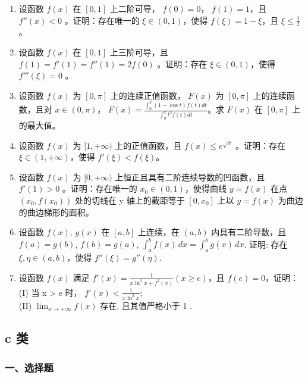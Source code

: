 \documentclass[12pt, a4paper]{ctexart}
\begin{document}
\begin{enumerate}[start=37]
    \item 设函数 $ f(x) $ 在 $ [0,1] $ 上二阶可导， $ f(0)=0 $， $ f(1)=1 $，且 $ f''(x)<0 $ 。证明：存在唯一的 $ \xi \in (0,1) $，使得 $ f(\xi)=1-\xi $，且 $ \xi \leq \frac{1}{2} $ 。

    \item 设函数 $ f(x) $ 在 $ [0,1] $ 上三阶可导，且 $ f(1) = f'(1) = f''(1) = 2f(0) $ 。证明：存在 $ \xi \in (0,1) $，使得 $ f'''(\xi) = 0 $ 。

    \item 设函数 $ f(x) $ 为 $ [0,\pi] $ 上的连续正值函数， $ F(x) $ 为 $ [0,\pi] $ 上的连续函数，且对 $ x \in (0,\pi) $， $ F(x) = \frac{\int_{0}^{x}(1 - \cos t)f(t)dt}{\int_{0}^{x}t^{2}f(t)dt} $。求 $ F(x) $ 在 $ [0,\pi] $ 上的最大值。

    \item 设函数 $ f(x) $ 为 $ [1,+\infty) $ 上的正值函数，且 $ f(x) \leq e^{\sqrt{x}} $ 。证明：存在 $ \xi \in (1,+\infty) $，使得 $ f'(\xi) < f(\xi) $。

    \item 设函数 $ f(x) $ 为 $ [0, +\infty) $ 上恒正且具有二阶连续导数的凹函数，且 $ f'(1) > 0 $ 。证明：存在唯一的 $ x_0 \in (0, 1) $，使得曲线 $ y = f(x) $ 在点 $ (x_0, f(x_0)) $ 处的切线在 y 轴上的截距等于 $ [0, x_0] $ 上以 $ y = f(x) $ 为曲边的曲边梯形的面积。

    \item 设函数 $ f(x) $, $ g(x) $ 在 $ [a,b] $ 上连续，在 $ (a,b) $ 内具有二阶导数，且 $ f(a) = g(b) $, $ f(b) = g(a) $, $ \int_{a}^{b} f(x) \, dx = \int_{a}^{b} g(x) \, dx $. 证明: 存在 $ \xi, \eta \in (a,b) $，使得 $ f''(\xi) = g''(\eta) $.

    \item 设函数 $ f(x) $ 满足 $ f'(x) = \frac{1}{x \ln^{2} x + f^{2}(x)} (x \geq e) $，且 $ f(e) = 0 $，证明：\\
    (I) 当 x > e 时， $ f'(x) < \frac{1}{x \ln^{2} x} $;\\
    (II) $ \lim_{x\to+\infty}f(x) $ 存在, 且其值严格小于 1 .
\end{enumerate}

\subsection{c 类}

\subsubsection*{一、选择题}
\end{document}
